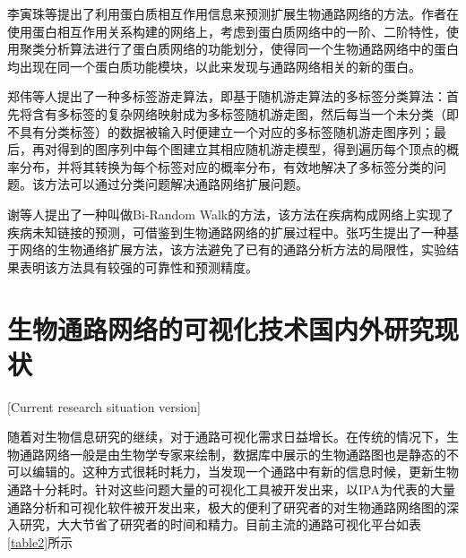 李寅珠\cite{李寅珠2012基于蛋白质相互作用网络的代谢}等提出了利用蛋白质相互作用信息来预测扩展生物通路网络的方法。作者在使用蛋白相互作用关系构建的网络上，考虑到蛋白质网络中的一阶、二阶特性，使用聚类分析算法进行了蛋白质网络的功能划分，使得同一个生物通路网络中的蛋白均出现在同一个蛋白质功能模块，以此来发现与通路网络相关的新的蛋白。

郑伟\cite{郑伟2010一种基于随机游走模型的多标签分类算法}等人提出了一种多标签游走算法，即基于随机游走算法的多标签分类算法：首先将含有多标签的复杂网络映射成为多标签随机游走图，然后每当一个未分类（即不具有分类标签）的数据被输入时便建立一个对应的多标签随机游走图序列；最后，再对得到的图序列中每个图建立其相应随机游走模型，得到遍历每个顶点的概率分布，并将其转换为每个标签对应的概率分布，有效地解决了多标签分类的问题。该方法可以通过分类问题解决通路网络扩展问题。

谢\cite{xie2012prioritizing}等人提出了一种叫做Bi-Random Walk的方法，该方法在疾病构成网络上实现了疾病未知链接的预测，可借鉴到生物通路网络的扩展过程中。张巧生\cite{zhang2016network}提出了一种基于网络的生物通络扩展方法，该方法避免了已有的通路分析方法的局限性，实验结果表明该方法具有较强的可靠性和预测精度。

\section{生物通路网络的可视化技术国内外研究现状}[Current research situation version]

随着对生物信息研究的继续，对于通路可视化需求日益增长。在传统的情况下，生物通路网络一般是由生物学专家来绘制，数据库中展示的生物通路图也是静态的不可以编辑的。这种方式很耗时耗力，当发现一个通路中有新的信息时候，更新生物通路十分耗时。针对这些问题大量的可视化工具被开发出来，以IPA为代表的大量通路分析和可视化软件被开发出来，极大的便利了研究者的对生物通路网络图的深入研究，大大节省了研究者的时间和精力。目前主流的通路可视化平台如表\ref{table2}所示

